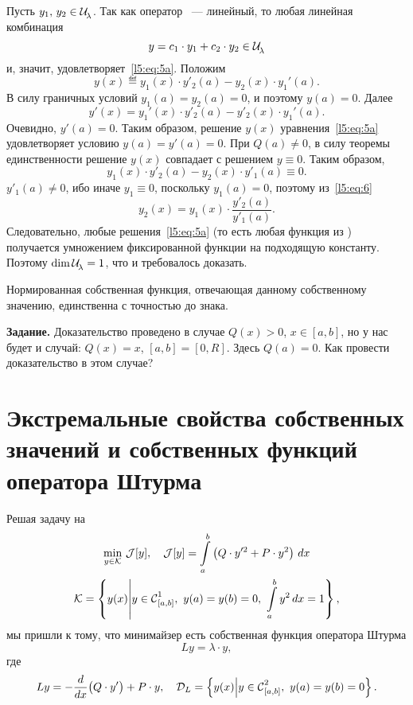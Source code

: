 Пусть $y_1,\,y_2\in\mathcal{U}\!{\mathstrut}_{\lambda}$. Так как оператор \LL\ --- линейный, то любая линейная комбинация
\begin{equation*}
	 y=c_1\cdot y_1+c_2\cdot y_2\in\mathcal{U}\!{\mathstrut}_{\lambda}
\end{equation*} 
и{\mb,} значит, удовлетворяет~\eqref{l5:eq:5a}. Положим 
\begin{equation*}
	 y(x)\eqdef y_1(x)\cdot y'_2(a)-y_2(x)\cdot y_1'(a).
\end{equation*}
В силу граничных условий $y_1(a)=y_2(a)=0${\mb,} и поэтому $y(a)=0$. Далее
\begin{equation*}
	 y'(x)=y_1'(x)\cdot y'_2(a)-y'_2(x)\cdot y_1'(a).
\end{equation*}
Очевидно{\mb,} $y'(a)=0$. Таким образом{\mb,} решение $y(x)$ уравнения~\eqref{l5:eq:5a} удовлетворяет условию $y(a)=y'(a)=0$. При $Q(a)\neq0${\mb,} в силу теоремы единственности решение $y(x)$ совпадает с решением $y\equiv0$. Таким образом{\mb,} 
\begin{equation}
	\label{l5:eq:6}
	 y_1(x)\cdot y'_2(a)-y_2(x)\cdot y'_1(a)\equiv0.
\end{equation}
$y'_1(a)\neq0$, ибо иначе $y_1\equiv0$, поскольку $y_1(a)=0$, поэтому из~\eqref{l5:eq:6}
\begin{equation*}
	 y_2(x)=y_1(x)\cdot\frac{y'_2(a)}{y'_1(a)}.
\end{equation*}  
Следовательно, любые решения~\eqref{l5:eq:5a} (то есть любая функция из \Ul) получается умножением фиксированной функции на подходящую константу. Поэтому $\dim\mathcal{U}\!{\mathstrut}_{\lambda}=1$, что и требовалось доказать.
\begin{_con}
	Нормированная собственная функция, отвечающая данному собственному значению, единственна с точностью до знака.
\end{_con}

\noindent\textbf{Задание. }Доказательство проведено в случае $Q(x)>0$, $x\in[a,b]$, но у нас будет и {} случай: $Q(x)=x$, $[a,b]=[0,R]$. Здесь $Q(a)=0$. Как провести доказательство в этом случае?
\vfill
\newpage
\section[Cвойства собственных значений оператора Штурма]{Экстремальные свойства собственных значений и собственных функций оператора Штурма}
\label{lecture5section2}
Решая задачу на 
\begin{multline*}
	\min\limits_{y\in\K}\,\J[y],\quad\J[y]=\int\limits_a^b\left(Q\cdot y'^2+P\cdot y^2\right)\,dx\\
	\K=\left\{y(x)\middle|y\in\Cfn[{[a,b]}]{1},\ y(a)=y(b)=0,\ \int\limits_a^b y^2\,dx=1\right\},
\end{multline*}
мы пришли к тому, что минимайзер есть собственная функция оператора Штурма
\begin{equation}
	\label{l5:eq:7}
	 Ly=\lambda\cdot y,
\end{equation}
где 
\begin{equation*}
	 Ly=-\der{}{x}\big(Q\cdot y'\big)+P\cdot y,\quad\mc{D}_{L}=\left\{y(x)\middle|y\in\Cfn[{[a,b]}]{2},\ y(a)=y(b)=0\right\}.
\end{equation*}

